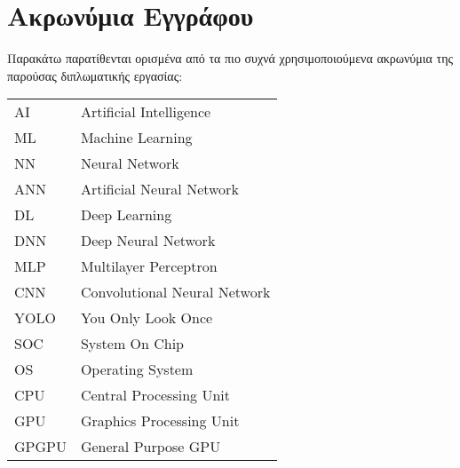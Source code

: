 \chapter*{Ακρωνύμια Εγγράφου}
\label{append:acronyms}
{}

Παρακάτω παρατίθενται ορισμένα από τα πιο συχνά χρησιμοποιούμενα ακρωνύμια της
παρούσας διπλωματικής εργασίας:

\begin{table}[htpb]
  \centering
  \begin{tabular}{l@{$\;\;\longrightarrow\;\;$}l}
    AI & Artificial Intelligence \\
    ML & Machine Learning \\
    NN & Neural Network \\
    ANN & Artificial Neural Network \\
    DL & Deep Learning \\
    DNN & Deep Neural Network \\
    MLP & Multilayer Perceptron \\
    CNN & Convolutional Neural Network \\
    YOLO & You Only Look Once \\
    SOC & System On Chip \\
    OS & Operating System \\
    CPU & Central Processing Unit \\
    GPU & Graphics Processing Unit \\
    GPGPU & General Purpose GPU
  \end{tabular}
\end{table}
